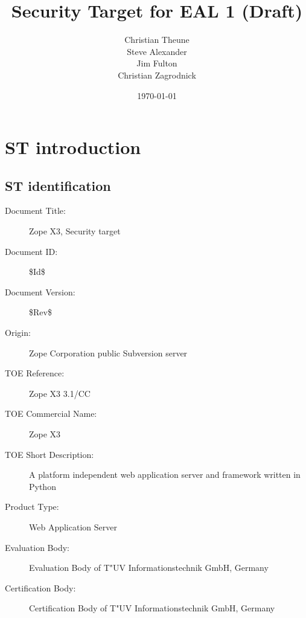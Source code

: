 \documentclass[12pt,english]{scrbook}
\title{Security Target for EAL 1 (Draft)}
\author{Christian Theune \\
  Steve Alexander \\
  Jim Fulton \\
  Christian Zagrodnick}
\date{\today}
\begin{document}
\maketitle



\tableofcontents
\newpage
\listoftables





\chapter{ST introduction}





\section{ST identification}

\begin{description}
  
  \item [Document Title:] Zope X3, Security target

  \item [Document ID:]
    \$Id$ $\$
  
  \item [Document Version:] \$Rev$ $\$
  
  \item [Origin:] Zope Corporation public Subversion server
  
  \item [TOE Reference:] Zope X3 3.1/CC       

  \item [TOE Commercial Name:] Zope X3   

  \item [TOE Short Description:] A platform independent web application server
  and framework written in Python


  \item [Product Type:] Web Application Server


  \item [Evaluation Body:] Evaluation Body of T"UV Informationstechnik GmbH,
  Germany

  \item [Certification Body:] Certification Body of T"UV Informationstechnik
  GmbH, Germany


\end{description}
\end{document}
